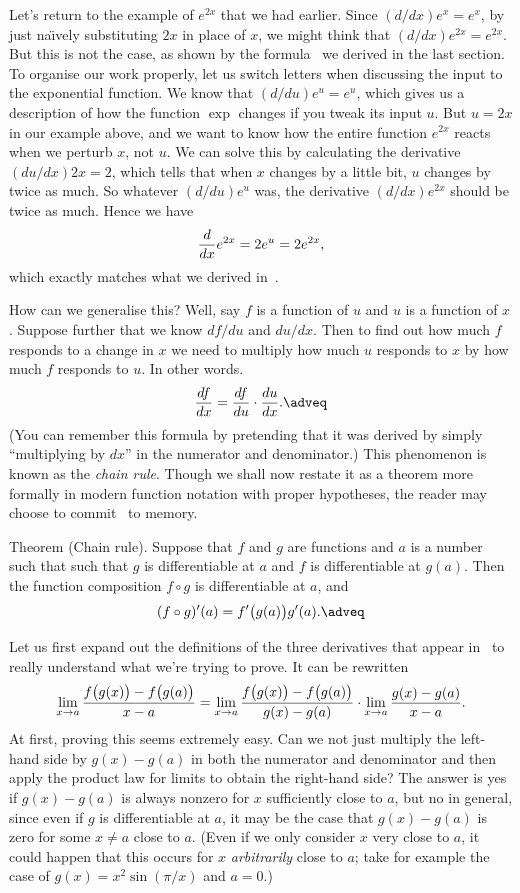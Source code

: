 Let's return to the example of $e^{2x}$ that we had earlier. Since $(d/dx) e^x = e^x$, by just na\"{\i}vely
substituting $2x$ in place of $x$, we might
think that $(d/dx) e^{2x} = e^{2x}$. But this is not the case, as shown by the formula~
we derived in the last section. To organise our work properly, let us switch letters when discussing
the input to the exponential function. We know that $(d/du) e^u = e^u$, which gives us a description of
how the function $\exp$ changes if you tweak its input $u$. But $u=2x$ in our example above,
and we want to know how the entire function $e^{2x}$ reacts when we perturb $x$, not $u$. We can solve
this by calculating the derivative $(du/dx) 2x = 2 $, which tells that when $x$ changes by a little bit,
$u$ changes by twice as much. So whatever $(d/du) e^u$ was, the derivative $(d/dx)e^{2x}$ should be twice
as much. Hence we have
$${d\over dx} e^{2x} = 2e^u = 2e^{2x},$$
which exactly matches what we derived in~.

How can we generalise this? Well, say $f$ is a function of $u$ and $u$ is a function of $x$. Suppose
further that we know $df/du$ and $du/dx$. Then to find out how much $f$ responds to a change in $x$
we need to multiply how much $u$ responds to $x$ by how much
$f$ responds to $u$. In other words.
\edef\eqleibnizchainrule{\the\eqcount}
$${df\over dx} = {df\over du}\cdot {du\over dx}.\adveq$$
(You can remember this formula by pretending that it was derived by simply ``multiplying by $dx$''
in the numerator and denominator.)
This phenomenon is known as the {\it chain rule}. Though we shall now
restate it as a theorem more formally in modern function notation with proper hypotheses, the reader
may choose to commit~\refeq{\eqleibnizchainrule} to memory.

\parenproclaim Theorem {\advthm} (Chain rule).
Suppose that $f$ and $g$ are functions and $a$ is a number such that
such that $g$ is differentiable at $a$ and $f$ is differentiable at $g(a)$. Then the function composition
$f\circ g$ is differentiable at $a$, and
\global\edef\eqchainrule{\the\eqcount}
$$(f\circ g)'(a) = f'\bigl(g(a)\bigr) g'(a).\adveq$$

Let us first expand out the definitions of the three derivatives
that appear in~\refeq{\eqchainrule} to really understand what we're trying to prove. It can be rewritten
$$ \lim_{x\to a} { f\bigl(g(x)\bigr) - f\bigl(g(a)\bigr)\over x-a}
= \lim_{x\to a} {f\bigl(g(x)\bigr) - f\bigl(g(a)\bigr) \over g(x) - g(a)}
\cdot \lim_{x\to a} {g(x) - g(a)\over x-a}.$$
At first, proving this seems extremely easy.
Can we not just multiply the left-hand side by $g(x) - g(a)$ in
both the numerator and denominator and then apply the product law for limits to obtain the right-hand side?
The answer is yes if $g(x) - g(a)$ is always nonzero for $x$ sufficiently close to $a$, but no
in general, since even if $g$ is differentiable at $a$,
it may be the case that $g(x) - g(a)$ is zero for some
$x\ne a$ close to $a$. (Even if we only consider $x$ very close to
$a$, it could happen that this occurs for $x$ {\it arbitrarily} close to $a$;
take for example the case of $g(x) = x^2\sin(\pi/x)$ and $a=0$.)

